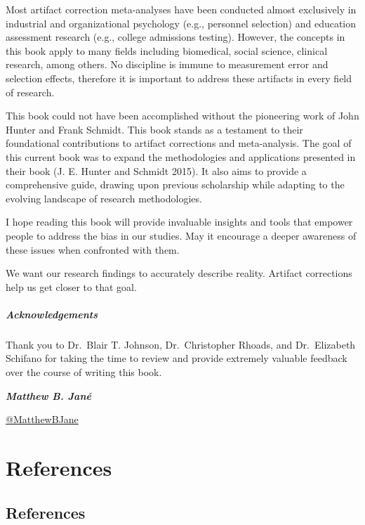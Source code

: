 \documentclass[
  letterpaper,
  DIV=11,
  numbers=noendperiod]{scrreprt}
\begin{document}
Most artifact correction meta-analyses have been conducted almost
exclusively in industrial and organizational psychology (e.g., personnel
selection) and education assessment research (e.g., college admissions
testing). However, the concepts in this book apply to many fields
including biomedical, social science, clinical research, among others.
No discipline is immune to measurement error and selection effects,
therefore it is important to address these artifacts in every field of
research.

This book could not have been accomplished without the pioneering work
of John Hunter and Frank Schmidt. This book stands as a testament to
their foundational contributions to artifact corrections and
meta-analysis. The goal of this current book was to expand the
methodologies and applications presented in their book (J. E. Hunter and
Schmidt 2015). It also aims to provide a comprehensive guide, drawing
upon previous scholarship while adapting to the evolving landscape of
research methodologies.

I hope reading this book will provide invaluable insights and tools that
empower people to address the bias in our studies. May it encourage a
deeper awareness of these issues when confronted with them.

We want our research findings to accurately describe reality. Artifact
corrections help us get closer to that goal.

\hypertarget{acknowledgements}{%
\subsubsection*{Acknowledgements}\label{acknowledgements}}

Thank you to Dr.~Blair T. Johnson, Dr.~Christopher Rhoads, and
Dr.~Elizabeth Schifano for taking the time to review and provide
extremely valuable feedback over the course of writing this book.

\textbf{\emph{Matthew B. Jané}}

\href{https://x.com/MatthewBJane}{ @MatthewBJane}

\part{References}

\hypertarget{references-1}{%
\chapter*{References}\label{references-1}}
\end{document}
